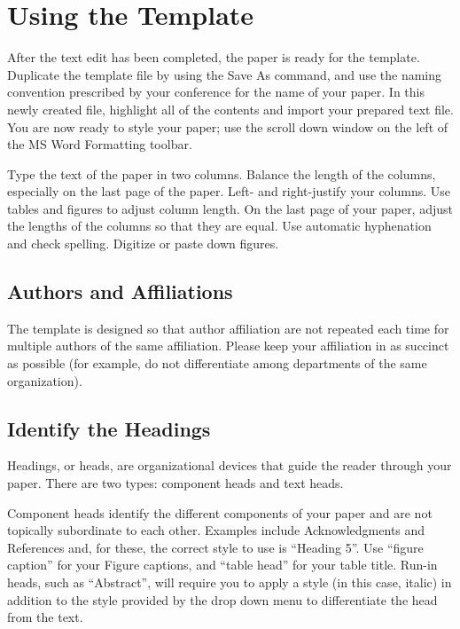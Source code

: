 \documentclass [a4paper,final,conference,10pt]{IDAACS}
\begin{document}
\section{Using the Template}

After the text edit has been completed, the paper is ready for the 
template. Duplicate the template file by using the Save As command, and use 
the naming convention prescribed by your conference for the name of your 
paper. In this newly created file, highlight all of the contents 
and import your prepared text file. You are now ready to style your paper; 
use the scroll down window on the left of the MS Word Formatting toolbar.

Type the text of the paper in two columns. Balance the length of 
the columns, especially on the last page of the paper. Left- and 
right-justify your columns. Use tables and figures to adjust column length. 
On the last page of your paper, adjust the lengths of the columns 
so that they are equal. Use automatic hyphenation and check spelling. 
Digitize or paste down figures.

\subsection{Authors and Affiliations}

The template is designed so that author affiliation are not repeated each time
for multiple authors of the same affiliation. Please keep your affiliation in
as succinct as possible (for example, do not differentiate among departments
of the same organization).

\subsection{Identify the Headings}

Headings, or heads, are organizational devices that guide the reader through 
your paper. There are two types: component heads and text heads.

Component heads identify the different components of your paper and are not 
topically subordinate to each other. Examples include Acknowledgments and 
References and, for these, the correct style to use is ``Heading 5''. Use 
``figure caption'' for your Figure captions, and ``table head'' for your 
table title. Run-in heads, such as ``Abstract'', will require you to apply a 
style (in this case, italic) in addition to the style provided by the drop 
down menu to differentiate the head from the text.
\end{document}

